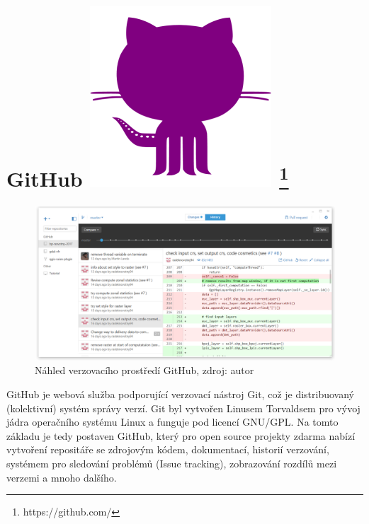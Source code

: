 \section[GitHub]{GitHub \includegraphics[scale=0.06]{./pictures/github.png} 
\footnote{https://github.com/}}
\label{github}
\begin{figure}[H]
    \centering \includegraphics[scale=0.45]{./pictures/github_screen.png}
      \caption[Náhled verzovacího prostředí GitHub]
      {Náhled verzovacího prostředí GitHub, zdroj: autor}
      \label{screen:github}
\end{figure}
GitHub je webová služba podporující verzovací nástroj Git, což je distribuovaný (kolektivní) systém správy verzí. Git byl vytvořen Linusem Torvaldsem pro vývoj jádra operačního systému Linux a funguje pod licencí GNU/GPL. Na tomto základu je tedy postaven GitHub, který pro open source projekty zdarma nabízí vytvoření repositáře se zdrojovým kódem, dokumentací, historií verzování, systémem pro sledování problémů (Issue tracking), zobrazování rozdílů mezi verzemi a mnoho dalšího.\cite{introducingGithub}

